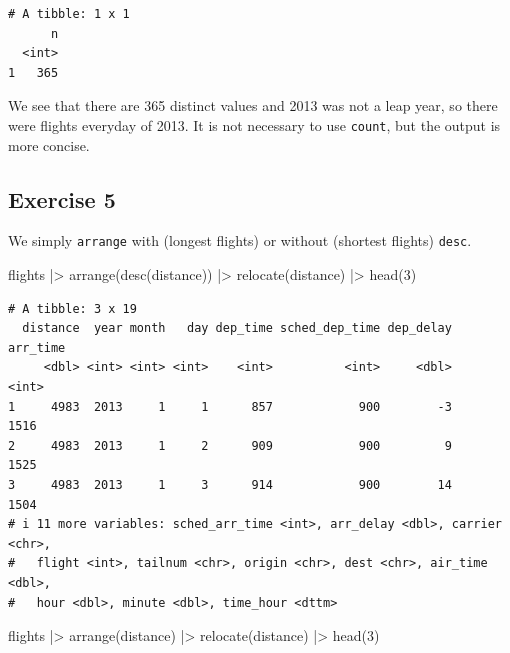 \documentclass[
  letterpaper,
  DIV=11,
  numbers=noendperiod]{scrreprt}
\newenvironment{Shaded}{\begin{snugshade}}{\end{snugshade}}
\newcommand{\DecValTok}[1]{\textcolor[rgb]{0.68,0.00,0.00}{#1}}
\newcommand{\FunctionTok}[1]{\textcolor[rgb]{0.28,0.35,0.67}{#1}}
\newcommand{\NormalTok}[1]{\textcolor[rgb]{0.00,0.23,0.31}{#1}}
\newcommand{\SpecialCharTok}[1]{\textcolor[rgb]{0.37,0.37,0.37}{#1}}
\begin{document}
\begin{verbatim}
# A tibble: 1 x 1
      n
  <int>
1   365
\end{verbatim}

We see that there are 365 distinct values and 2013 was not a leap year,
so there were flights everyday of 2013. It is not necessary to use
\texttt{count}, but the output is more concise.

\subsection{Exercise 5}\label{exercise-5-2}

We simply \texttt{arrange} with (longest flights) or without (shortest
flights) \texttt{desc}.

\begin{Shaded}
\begin{Highlighting}[]
\NormalTok{flights }\SpecialCharTok{|\textgreater{}}
  \FunctionTok{arrange}\NormalTok{(}\FunctionTok{desc}\NormalTok{(distance)) }\SpecialCharTok{|\textgreater{}}
  \FunctionTok{relocate}\NormalTok{(distance) }\SpecialCharTok{|\textgreater{}}
  \FunctionTok{head}\NormalTok{(}\DecValTok{3}\NormalTok{)}
\end{Highlighting}
\end{Shaded}

\begin{verbatim}
# A tibble: 3 x 19
  distance  year month   day dep_time sched_dep_time dep_delay arr_time
     <dbl> <int> <int> <int>    <int>          <int>     <dbl>    <int>
1     4983  2013     1     1      857            900        -3     1516
2     4983  2013     1     2      909            900         9     1525
3     4983  2013     1     3      914            900        14     1504
# i 11 more variables: sched_arr_time <int>, arr_delay <dbl>, carrier <chr>,
#   flight <int>, tailnum <chr>, origin <chr>, dest <chr>, air_time <dbl>,
#   hour <dbl>, minute <dbl>, time_hour <dttm>
\end{verbatim}

\begin{Shaded}
\begin{Highlighting}[]
\NormalTok{flights }\SpecialCharTok{|\textgreater{}}
  \FunctionTok{arrange}\NormalTok{(distance) }\SpecialCharTok{|\textgreater{}}
  \FunctionTok{relocate}\NormalTok{(distance) }\SpecialCharTok{|\textgreater{}}
  \FunctionTok{head}\NormalTok{(}\DecValTok{3}\NormalTok{)}
\end{Highlighting}
\end{Shaded}
\end{document}
